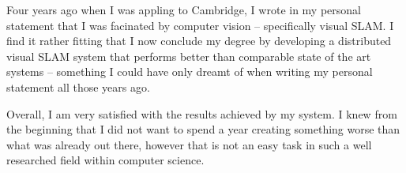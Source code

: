 Four years ago when I was appling to Cambridge, I wrote in my personal statement that I was facinated by computer vision – specifically visual SLAM. I find it rather fitting that I now conclude my degree by developing a distributed visual SLAM system that performs better than comparable state of the art systems – something I could have only dreamt of when writing my personal statement all those years ago.

Overall, I am very satisfied with the results achieved by my system. I knew from the beginning that I did not want to spend a year creating something worse than what was already out there, however that is not an easy task in such a well researched field within computer science.